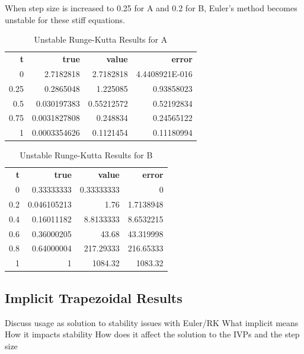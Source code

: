 \documentclass{article}
\begin{document}
When step size is increased to 0.25 for A and 0.2 for B, Euler's method becomes unstable for these stiff equations.



\begin{table}
\footnotesize
\centering
\caption{Unstable Runge-Kutta Results for A}
\label{tab:un_a_rk}
\begin{tabular}{rrrr}
\textbf{t} & \textbf{true} & \textbf{value} & \textbf{error} \\
0          & 2.7182818     & 2.7182818      & 4.4408921E-016 \\
0.25       & 0.2865048     & 1.225085       & 0.93858023     \\
0.5        & 0.030197383   & 0.55212572     & 0.52192834     \\
0.75       & 0.0031827808  & 0.248834       & 0.24565122     \\
1          & 0.0003354626  & 0.1121454      & 0.11180994        
\end{tabular}
\end{table}

\begin{table}
\footnotesize
\centering
\caption{Unstable Runge-Kutta Results for B}
\label{tab:un_b_rk}
\begin{tabular}{rrrr}
\textbf{t} & \textbf{true} & \textbf{value} & \textbf{error} \\
0          & 0.33333333    & 0.33333333     & 0              \\
0.2        & 0.046105213   & 1.76           & 1.7138948      \\
0.4        & 0.16011182    & 8.8133333      & 8.6532215      \\
0.6        & 0.36000205    & 43.68          & 43.319998      \\
0.8        & 0.64000004    & 217.29333      & 216.65333      \\
1          & 1             & 1084.32        & 1083.32       
\end{tabular}
\end{table}



\subsection{Implicit Trapezoidal Results}
\label{results:implicit}

Discuss usage as solution to stability issues with Euler/RK
What implicit means
How it impacts stability
How does it affect the solution to the IVPs and the step size
\end{document}
